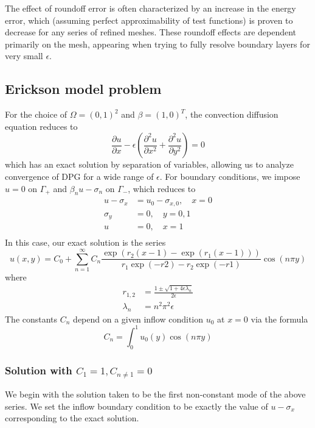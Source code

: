 \documentclass[11pt,onecolumn]{scrartcl}
\newcommand{\pd}[2]{\frac{\partial#1}{\partial#2}}
\newcommand{\pdd}[2]{\frac{\partial^2#1}{\partial#2^2}}
\begin{document}
The effect of roundoff error is often characterized by an increase in the energy error, which (assuming perfect approximability of test functions) is proven to decrease for any series of refined meshes. These roundoff effects are dependent primarily on the mesh, appearing when trying to fully resolve boundary layers for very small $\epsilon$. 


\subsection{Erickson model problem}

For the choice of $\Omega = (0,1)^2$ and $\beta = (1,0)^T$, the convection diffusion equation reduces to
\[
\pd{u}{x} - \epsilon \left(\pdd{u}{x}+ \pdd{u}{y}\right) = 0
\]
which has an exact solution by separation of variables, allowing us to analyze convergence of DPG for a wide range of $\epsilon$.  For boundary conditions, we impose $u=0$ on $\Gamma_+$ and $\beta_n u - \sigma_n$ on $\Gamma_-$, which reduces to
\begin{align*}
u-\sigma_x &= u_0-\sigma_{x,0}, \quad x=0\\
\sigma_y &=  0, \quad y=0,1\\
u &= 0, \quad x=1\\
\end{align*}
In this case, our exact solution is the series
\[
u(x,y) = C_0 + \sum_{n=1}^\infty C_n \frac{\exp(r_2(x-1)-\exp(r_1(x-1)))}{r_1\exp(-r2) - r_2\exp(-r1)}\cos(n\pi y)
\]
where
\begin{align*}
r_{1,2} &= \frac{1 \pm \sqrt{1 + 4 \epsilon\lambda_n}}{2 \epsilon}\\
\lambda_n &= n^2\pi^2 \epsilon
\end{align*}
The constants $C_n$ depend on a given inflow condition $u_0$ at $x=0$ via the formula
\[
C_n = \int_0^1 u_0(y) \cos(n\pi y)
\]

\subsubsection{Solution with $C_1 = 1, C_{n\neq 1} = 0$}

We begin with the solution taken to be the first non-constant mode of the above series.  We set the inflow boundary condition to be exactly the value of $u-\sigma_x$ corresponding to the exact solution.  
\end{document}
